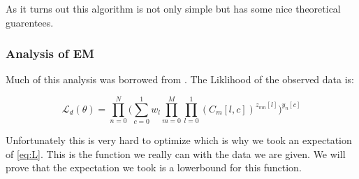 As it turns out this algorithm is not only simple but has some nice theoretical guarentees.

\subsubsection{Analysis of EM}
Much of this analysis was borrowed from \cite{murphy2012machine}. The Liklihood of the observed data is:

\begin{equation}  \label{eq:observedL}
\mathcal{L}_{d}(\theta) =
\displaystyle\prod\limits_{n=0}^{N} \Big ( \displaystyle\sum\limits_{c=0}^{1}
w_{l} \displaystyle\prod\limits_{m=0}^{M} \displaystyle\prod\limits_{l=0}^{1} (C_{m}[l,c])^{z_{mn}[l]} \Big )^{y_{n}[c]}
\end{equation}

Unfortunately this is very hard to optimize which is why we took an expectation of \eqref{eq:L}. This is the function we really can with the data we are given. We will prove that the expectation we took is a lowerbound for this function.

